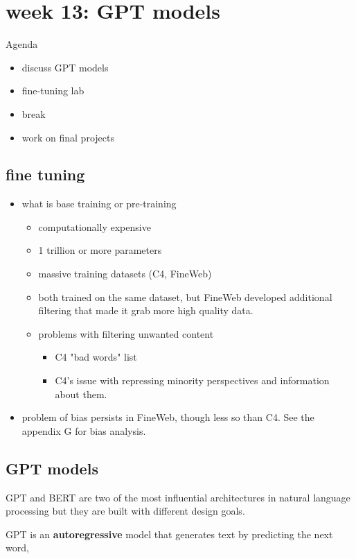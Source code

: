 \documentclass[11pt]{article}
\author{fcalado}
\date{\today}
\title{}
\begin{document}
\tableofcontents

\section{week 13: GPT models}
\label{sec:org33f4f0f}
Agenda
\begin{itemize}
\item discuss GPT models
\item fine-tuning lab
\item break
\item work on final projects
\end{itemize}

\subsection{fine tuning}
\label{sec:org0773b00}
\begin{itemize}
\item what is base training or pre-training
\begin{itemize}
\item computationally expensive
\item 1 trillion or more parameters
\item massive training datasets (C4, FineWeb)
\item both trained on the same dataset, but FineWeb developed additional
filtering that made it grab more high quality data.
\item problems with filtering unwanted content
\begin{itemize}
\item C4 "bad words" list
\item C4's issue with repressing minority perspectives and information
about them.
\end{itemize}
\end{itemize}
\item problem of bias persists in FineWeb, though less so than C4. See the
appendix G for bias analysis.
\end{itemize}
\subsection{GPT models}
\label{sec:orgec9eaf7}
GPT and BERT are two of the most influential architectures in natural
language processing but they are built with different design goals.


GPT is an \textbf{\textbf{autoregressive}} model that generates text by predicting
the next word,
\end{document}

